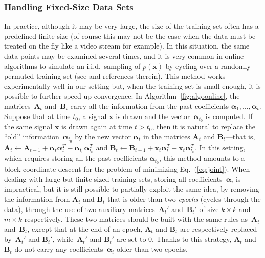 \documentclass[twoside,11pt]{article}
\def\x{{\mathbf x}}
\def\alphab{{\boldsymbol\alpha}}
\def\B{{\mathbf B}}
\def\A{{\mathbf A}}
\begin{document}
\subsubsection{Handling Fixed-Size Data Sets}
In practice, although it may be very large, the size of the training
set often has a predefined finite size (of course this may not be the case when the data
must be treated on the fly like a video stream for
example). In this situation, the same data points may be examined
several times, and it is very common in online algorithms to simulate an
i.i.d.~sampling of $p(\x)$ by cycling over a randomly permuted
training set (see \citealp{bottou} and references therein). This method works experimentally well in our
setting but, when the training set is small enough, it is
possible to further speed up convergence: In Algorithm~\ref{fig:algoonline},
the matrices~$\A_t$ and~$\B_t$ carry all the
information from the past coefficients
$\alphab_1,\ldots,\alphab_{t}$. Suppose that at time $t_0$, a
signal $\x$ is drawn and the vector~$\alphab_{t_0}$ is computed. If the
same signal $\x$ is drawn again at time $t > t_0$, then it is natural
to replace the ``old'' information~$\alphab_{t_0}$ by the new
vector $\alphab_t$ in the matrices $\A_t$ and $\B_t$---that is, $\A_{t} \leftarrow \A_{t-1} +
\alphab_{t}\alphab_{t}^T - \alphab_{t_0}\alphab_{t_0}^T$ and $\B_{t} \leftarrow \B_{t-1} +
\x_{t}\alphab_{t}^T - \x_t\alphab_{t_0}^T$.
In this setting, which requires storing all the past coefficients
$\alphab_{t_0}$, this method amounts to a block-coordinate descent for the
problem of minimizing Eq.~(\ref{eq:joint}).
When dealing with large but finite sized training sets, storing
all coefficients~$\alphab_{i}$ is impractical, but it is
still possible to partially exploit the same idea, by removing
the information from $\A_t$ and $\B_t$ that is older than two
{\em epochs} (cycles through the data), through the use of two auxiliary
matrices~$\A_t'$ and~$\B_t'$ of size $k \times k$ and $m \times k$
respectively.  These two matrices should be built with the same rules as~$\A_t$
and~$\B_t$, except that at the end of an epoch, $\A_t$ and $\B_t$ are
respectively replaced by~$\A_t'$ and $\B_t'$, while~$\A_t'$ and $\B_t'$ are set
to $0$. Thanks to this strategy, $\A_t$ and $\B_t$ do not carry any coefficients~$\alphab_i$ older than two epochs.
\end{document}
